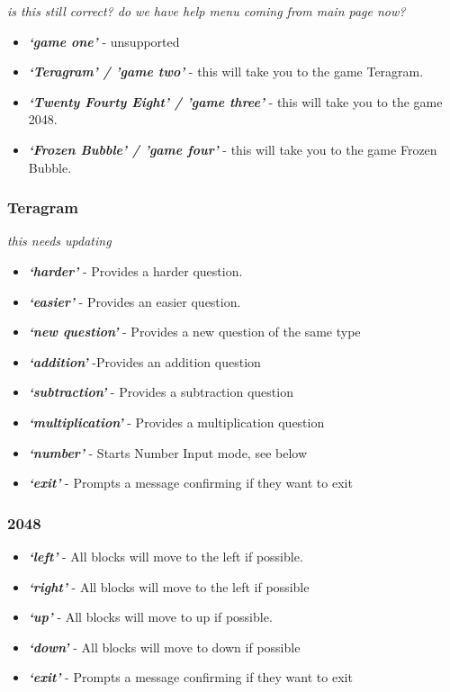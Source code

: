 \documentclass[11pt, oneside]{article}
\begin{document}
{\em is this still correct? do we have help menu coming from main page now?}

\begin{itemize}
  \item {\em\bf`game one'} - unsupported
  \item {\em\bf`Teragram' / 'game two'}  - this will take you to the game Teragram.
  \item {\em\bf`Twenty Fourty Eight' / 'game three'} - this will take you to the game 2048.
  \item {\em\bf`Frozen Bubble' / 'game four'} - this will take you to the game Frozen Bubble.
\end{itemize}

\subsubsection{Teragram}

{\em this needs updating}
\begin{itemize}
  \item {\em\bf`harder'} - Provides a harder question. 
  \item {\em\bf`easier'} - Provides an easier question.
  \item {\em\bf`new question'} - Provides a new question of the same type
  \item {\em\bf`addition'} -Provides an addition question
  \item {\em\bf`subtraction'} - Provides a subtraction question
  \item {\em\bf`multiplication'} - Provides a multiplication question 
  \item {\em\bf`number'} - Starts Number Input mode, see below
  \item {\em\bf`exit'} - Prompts a message confirming if they want to exit
 
\end{itemize}

\subsubsection{2048}

\begin{itemize}
	\item {\em\bf`left'} - All blocks will move to the left if possible. 
	\item {\em\bf`right'} - All blocks will move to the left if possible
	\item {\em\bf`up'} - All blocks will move to up if possible. 
	\item {\em\bf`down'} - All blocks will move to down if possible
	\item {\em\bf`exit'} - Prompts a message confirming if they want to exit
	
\end{itemize}
\end{document}
